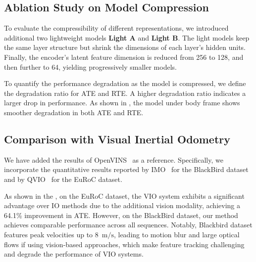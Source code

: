 \subsection{Ablation Study on Model Compression}
\label{sec:airio:modelsize}
To evaluate the compressibility of different representations, we introduced additional two lightweight models \textbf{Light A} and \textbf{Light B}. The light models keep the same layer structure but shrink the dimensions of each layer's hidden units. Finally, the encoder's latent feature dimension is reduced from 256 to 128, and then further to 64, yielding progressively smaller models.

To quantify the performance degradation as the model is compressed, we define the degradation ratio for ATE and RTE. A higher degradation ratio indicates a larger drop in performance. As shown in , the model under body frame shows smoother degradation in both ATE and RTE.


\subsection{Comparison with Visual Inertial Odometry}
\label{sec:airio:vio}
We have added the results of OpenVINS~\cite{geneva2020openvins} as a reference. Specifically, we incorporate the quantitative results reported by IMO~\cite{CioffiRal2023} for the BlackBird dataset and by QVIO~\cite{peng2024quantized} for the EuRoC dataset.

As shown in the , on the EuRoC dataset, the VIO system exhibits a significant advantage over IO methods due to the additional vision modality, achieving a 64.1\% improvement in ATE. However, on the BlackBird dataset, our method achieves comparable performance across all sequences. Notably, Blackbird dataset features peak velocities up to 8~$\mathrm{m/s}$, leading to motion blur and large optical flows if using vision-based approaches, which make feature tracking challenging and degrade the performance of VIO systems.


